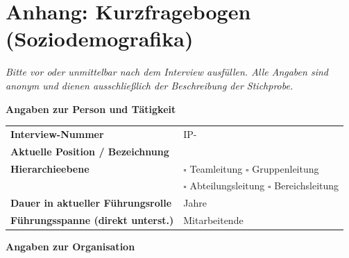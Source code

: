 
\blocksep

\section*{Anhang: Kurzfragebogen (Soziodemografika)}
\textit{Bitte vor oder unmittelbar nach dem Interview ausfüllen. Alle Angaben
  sind anonym und dienen ausschließlich der Beschreibung der Stichprobe.}

\noindent\textbf{Angaben zur Person und Tätigkeit}

\vspace{0.4em}

\begin{tabularx}{\linewidth}{@{}lX@{}}
  \toprule
  \textbf{Interview-Nummer}
    & IP-\underline{\hspace{7cm}} \\[5pt]
  \textbf{Aktuelle Position / Bezeichnung}
    & \underline{\hspace{7cm}} \\[5pt]
  \textbf{Hierarchieebene} & $\square$ Teamleitung \quad
      $\square$ Gruppenleitung \\ &
      $\square$ Abteilungsleitung \quad
      $\square$ Bereichsleitung \\[5pt]
  \textbf{Dauer in aktueller Führungsrolle}
    & \underline{\hspace{4cm}} Jahre \\[5pt]
  \textbf{Führungsspanne (direkt unterst.)}
    & \underline{\hspace{4cm}} Mitarbeitende \\
  \bottomrule
\end{tabularx}

\vspace{0.8em}

\noindent\textbf{Angaben zur Organisation}

\vspace{0.4em}

